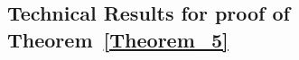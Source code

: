 \documentclass[twoside,11pt]{article}
\begin{document}







\subsection{Technical Results for proof of Theorem~\ref{Theorem_5}}
\end{document}
